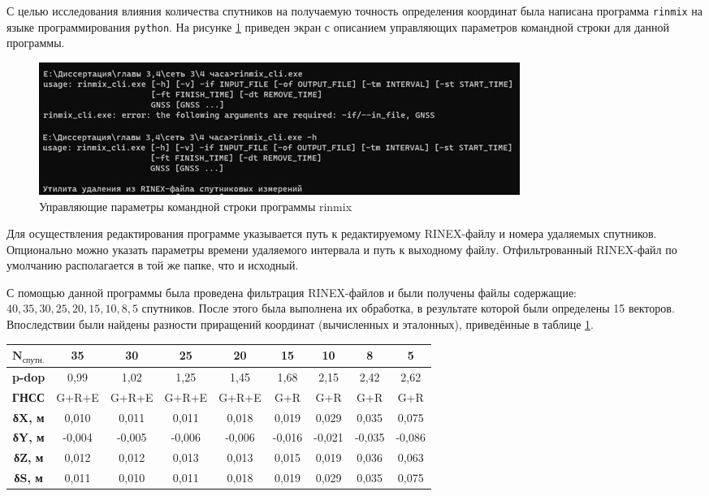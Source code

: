 С целью исследования влияния количества спутников на получаемую точность определения координат была написана программа \texttt{rinmix} на языке программирования \texttt{python}. На рисунке \cref{fig:pic20} приведен экран с описанием управляющих параметров командной строки для данной программы.

\begin{figure}[!h]
	\centering
	\includegraphics[width=0.99\linewidth]{images/pic20}
	\caption{Управляющие параметры командной строки программы rinmix }
	\label{fig:pic20}
\end{figure}

Для осуществления редактирования программе указывается путь к редактируемому RINEX-файлу и номера удаляемых спутников. Опционально можно указать параметры времени удаляемого интервала и путь к выходному файлу. Отфильтрованный RINEX-файл по умолчанию располагается в той же папке, что и исходный.

С помощью данной программы была проведена фильтрация RINEX-файлов и были получены файлы содержащие: $40, 35, 30, 25, 20, 15, 10, 8, 5$ спутников. После этого была выполнена их обработка, в результате которой были определены 15 векторов. Впоследствии были найдены разности приращений координат (вычисленных и эталонных), приведённые в таблице \cref{tab:tab22}.

\begin{table} [htbp]
	\centering\small
	\label{tab:tab22}{%
			\begin{tabular}{|c|c|c|c|c|c|c|c|c|}
				\hline
				$\mathbf{N_\text{спутн.}}$ & \textbf{35} & \textbf{30} & \textbf{25} & \textbf{20} & \textbf{15} & \textbf{10} & \textbf{8} & \textbf{5} \\ \hline
				\textbf{p-dop}	& 0,99   & 1,02   & 1,25   & 1,45   & 1,68   & 2,15   & 2,42   & 2,62   \\ \hline
				\textbf{ГНСС}	& G+R+E  & G+R+E  & G+R+E  & G+R+E  & G+R    & G+R    & G+R    & G+R    \\ \hline
				\textbf{δX, м}	& 0,010  & 0,011  & 0,011  & 0,018  & 0,019  & 0,029  & 0,035  & 0,075  \\ \hline
				\textbf{δY, м}	& -0,004 & -0,005 & -0,006 & -0,006 & -0,016 & -0,021 & -0,035 & -0,086 \\ \hline
				\textbf{δZ, м}	& 0,012  & 0,012  & 0,013  & 0,013  & 0,015  & 0,019  & 0,036  & 0,063  \\ \hline
				\textbf{δS, м}	& 0,011  & 0,010  & 0,011  & 0,018  & 0,019  & 0,029  & 0,035  & 0,075  \\ \hline
			\end{tabular}
	}
\end{table}

